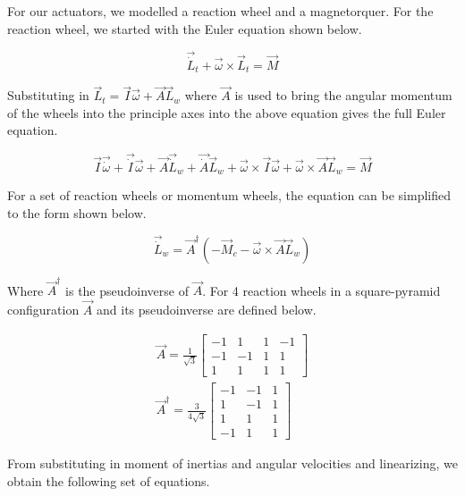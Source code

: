 For our actuators, we modelled a reaction wheel and a magnetorquer. For the reaction wheel, we started with the Euler equation shown below.

\begin{equation}
    \Vec{\dot L}_t + \Vec{\omega} \times \Vec{L}_t = \Vec{M}
\end{equation}

Substituting in $\Vec{L}_t = \Vec{I} \Vec{\omega} + \Vec{A} \Vec{L}_w$ where $\Vec{A}$ is used to bring the angular momentum of the wheels into the principle axes into the above equation gives the full Euler equation.

\begin{equation}
    \Vec{I} \Vec{\dot \omega} + \Vec{\dot I} \Vec{\omega} + \Vec{A} \Vec{\dot L}_w + \Vec{\dot A} \Vec{L}_w + \Vec{\omega} \times \Vec{I} \Vec{\omega} + \Vec{\omega} \times \Vec{A} \Vec{L}_w = \Vec{M}
\end{equation}

For a set of reaction wheels or momentum wheels, the equation can be simplified to the form shown below.

\begin{equation}
    \Vec{\dot L}_w = \Vec{A}^\dagger \left( - \Vec{M}_c - \Vec{\omega} \times \Vec{A} \Vec{L}_w \right)
\end{equation}

Where $\vec{A}^\dagger$ is the pseudoinverse of $\vec{A}$. For 4 reaction wheels in a square-pyramid configuration $\vec{A}$ and its pseudoinverse are defined below.

\begin{align*}
    \vec{A} = \frac{1}{\sqrt{3}} \begin{bmatrix}
        -1 & 1 & 1 & -1 \\
        -1 & -1 & 1 & 1 \\
        1 & 1 & 1 & 1
    \end{bmatrix} \\
    \vec{A}^\dagger = \frac{3}{4\sqrt{3}} \begin{bmatrix}
        -1 & -1 & 1 \\
        1 & -1 & 1 \\
        1 & 1 & 1 \\
        -1 & 1 & 1
    \end{bmatrix}
\end{align*}

From substituting in moment of inertias and angular velocities and linearizing, we obtain the following set of equations.


